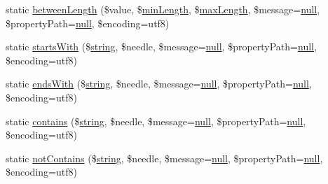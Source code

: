 \begin{DoxyCompactItemize}
\item 
static \mbox{\hyperlink{class_assert_1_1_assertion_a91d1ad8b5193d6d0b858f36fe2f2e498}{between\+Length}} (\$value, \$\mbox{\hyperlink{class_assert_1_1_assertion_a736ca1fb9ef01c5a9b681897454f97ad}{min\+Length}}, \$\mbox{\hyperlink{class_assert_1_1_assertion_af2f8972f2c216c9627ee456de9e6841f}{max\+Length}}, \$message=\mbox{\hyperlink{class_assert_1_1_assertion_af95d8b1582dd619cc0159041bc6892c5}{null}}, \$property\+Path=\mbox{\hyperlink{class_assert_1_1_assertion_af95d8b1582dd619cc0159041bc6892c5}{null}}, \$encoding=\textquotesingle{}utf8\textquotesingle{})
\item 
static \mbox{\hyperlink{class_assert_1_1_assertion_a2a68751d67ac314f75f2938b31e7cb0b}{starts\+With}} (\$\mbox{\hyperlink{class_assert_1_1_assertion_aa0a4c5729fb9083a7500e00633661311}{string}}, \$needle, \$message=\mbox{\hyperlink{class_assert_1_1_assertion_af95d8b1582dd619cc0159041bc6892c5}{null}}, \$property\+Path=\mbox{\hyperlink{class_assert_1_1_assertion_af95d8b1582dd619cc0159041bc6892c5}{null}}, \$encoding=\textquotesingle{}utf8\textquotesingle{})
\item 
static \mbox{\hyperlink{class_assert_1_1_assertion_a3e51dd9911630c3c6a0b7cdc392030e9}{ends\+With}} (\$\mbox{\hyperlink{class_assert_1_1_assertion_aa0a4c5729fb9083a7500e00633661311}{string}}, \$needle, \$message=\mbox{\hyperlink{class_assert_1_1_assertion_af95d8b1582dd619cc0159041bc6892c5}{null}}, \$property\+Path=\mbox{\hyperlink{class_assert_1_1_assertion_af95d8b1582dd619cc0159041bc6892c5}{null}}, \$encoding=\textquotesingle{}utf8\textquotesingle{})
\item 
static \mbox{\hyperlink{class_assert_1_1_assertion_a0558ee517dbe9a66de6eb3db4beb81a7}{contains}} (\$\mbox{\hyperlink{class_assert_1_1_assertion_aa0a4c5729fb9083a7500e00633661311}{string}}, \$needle, \$message=\mbox{\hyperlink{class_assert_1_1_assertion_af95d8b1582dd619cc0159041bc6892c5}{null}}, \$property\+Path=\mbox{\hyperlink{class_assert_1_1_assertion_af95d8b1582dd619cc0159041bc6892c5}{null}}, \$encoding=\textquotesingle{}utf8\textquotesingle{})
\item 
static \mbox{\hyperlink{class_assert_1_1_assertion_ae5ec5d5082b3deab0cb2342f0e0ebfd3}{not\+Contains}} (\$\mbox{\hyperlink{class_assert_1_1_assertion_aa0a4c5729fb9083a7500e00633661311}{string}}, \$needle, \$message=\mbox{\hyperlink{class_assert_1_1_assertion_af95d8b1582dd619cc0159041bc6892c5}{null}}, \$property\+Path=\mbox{\hyperlink{class_assert_1_1_assertion_af95d8b1582dd619cc0159041bc6892c5}{null}}, \$encoding=\textquotesingle{}utf8\textquotesingle{})

\end{DoxyCompactItemize}
